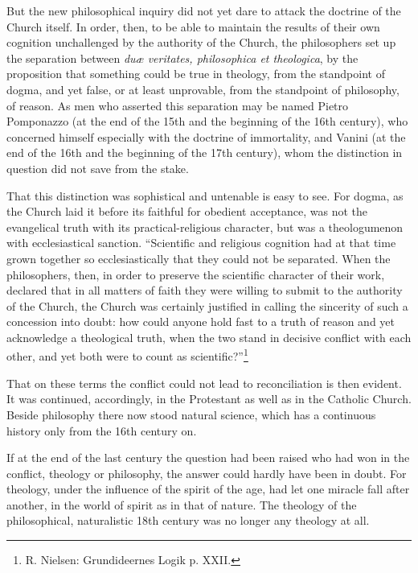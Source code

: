 \documentclass[12pt,a4paper]{book}
\newcommand{\opage}[1]{\marginnote{\footnotesize\textit{[#1]}}}
\begin{document}
But the new philosophical inquiry did not yet dare to attack the doctrine of
the Church itself. In order, then, to be able to maintain the results of their
own cognition unchallenged by the authority of the Church, the philosophers set
up the separation between \textit{duæ veritates, philosophica et theologica},
by the proposition that something could be true in theology, from the
standpoint of dogma, and yet false, or at least unprovable, from the
standpoint of philosophy, of reason. As men who asserted this separation may be
named Pietro Pomponazzo (at the end of the 15th and the beginning of the 16th
century), who concerned himself especially with the doctrine of immortality,
and Vanini (at the end of the 16th and the beginning of the 17th century), whom
the distinction in question did not save from the stake.

That this distinction was sophistical and untenable is easy to see. For dogma,
as the Church laid it before its faithful for obedient acceptance, was not the
evangelical truth with its practical-religious character, but was a
theologumenon with ecclesiastical sanction. ``Scientific and religious
cognition had at that time grown together so ecclesiastically that they could
not be separated. When the philosophers, then, in order to preserve the
scientific character of their work, declared that in all matters of faith they
were willing to submit to the authority of the Church, the Church was
certainly justified in calling the sincerity of such a concession into doubt:
how could anyone hold fast to a truth of reason and yet acknowledge a
theological truth, when the two stand in
\opage{14}\setcounter{footnote}{0}%
decisive conflict with each other, and yet both were to count as
scientific?''\footnote{R. Nielsen: Grundideernes Logik p. XXII.}

That on these terms the conflict could not lead to reconciliation is then
evident. It was continued, accordingly, in the Protestant as well as in the
Catholic Church. Beside philosophy there now stood natural science, which has
a continuous history only from the 16th century on.

If at the end of the last century the question had been raised who had won in
the conflict, theology or philosophy, the answer could hardly have been in
doubt. For theology, under the influence of the spirit of the age, had let one
miracle fall after another, in the world of spirit as in that of nature. The
theology of the philosophical, naturalistic 18th century was no longer any
theology at all.
\end{document}
